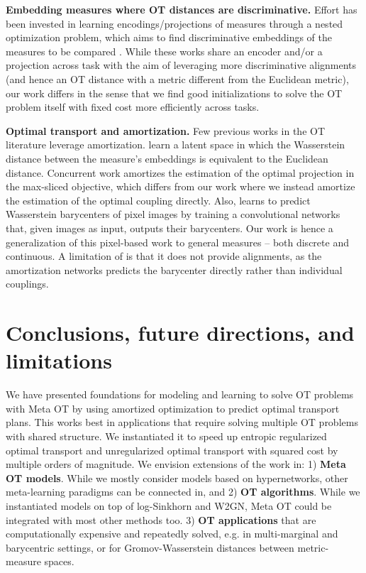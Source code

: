 \documentclass{article}
\newcommand{\eg}{e.g.\xspace}
\begin{document}
\textbf{Embedding measures where OT distances are discriminative.}
Effort has been invested in learning encodings/projections of measures
through a nested optimization problem, which aims to find
discriminative embeddings of the measures to be compared
\citep{pmlr-v84-genevay18a, deshpande2019max,nguyen2022amortized}.
While these works share an encoder and/or a projection across task
with the aim of leveraging more discriminative alignments (and hence
an OT distance with a metric different from the Euclidean metric), our
work differs in the sense that we find good initializations to solve
the OT problem itself with fixed cost more efficiently across tasks.

\textbf{Optimal transport and amortization.}
Few previous works in the OT literature leverage
amortization. \citet{courty2017learning} learn a latent space in which
the Wasserstein distance between the measure's embeddings is
equivalent to the Euclidean distance. Concurrent work
\citep{nguyen2022amortized} amortizes the estimation of the optimal
projection in the max-sliced objective, which differs from our work
where we instead amortize the estimation of the optimal coupling
directly. Also, \citet{lacombe2021learning} learns to predict
Wasserstein barycenters of pixel images by training a convolutional
networks that, given images as input, outputs their barycenters. Our
work is hence a generalization of this pixel-based work to general
measures -- both discrete and continuous. A limitation of
\citet{lacombe2021learning} is that it does not provide alignments, as
the amortization networks predicts the barycenter directly rather than
individual couplings.

\section{Conclusions, future directions, and limitations}
\label{sec:con}
We have presented foundations for modeling and learning to
solve OT problems with Meta OT by using amortized optimization
to predict optimal transport plans.
This works best in applications that require solving
multiple OT problems with shared structure.
We instantiated it to speed up entropic regularized optimal
transport and unregularized optimal transport with squared
cost by multiple orders of magnitude.
We envision extensions of the work in:
1) \textbf{Meta OT models}.
While we mostly consider models based on hypernetworks,
other meta-learning paradigms can be connected in,
and
2) \textbf{OT algorithms}. While we instantiated
models on top of log-Sinkhorn and W2GN, Meta OT
could be integrated with most other methods too.
3) \textbf{OT applications} that are computationally
expensive and repeatedly solved, \eg in multi-marginal
and barycentric settings, or for Gromov-Wasserstein
distances between metric-measure spaces.
\end{document}
